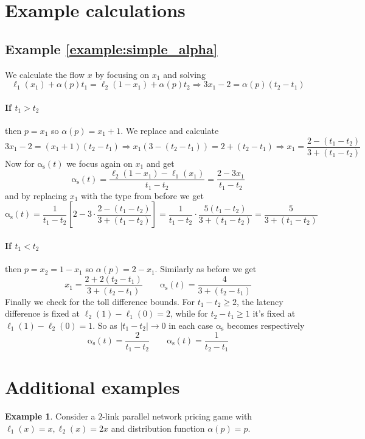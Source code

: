 \documentclass[10pt,a4paper]{book}
\newcommand{\as}{\mathrm{\alpha_s}}
\theoremstyle{definition}
\theoremstyle{comment}
\newtheorem{example}[definition]{Example}
\begin{document}
\section*{Example calculations}

\subsection*{Example \ref{example:simple_alpha}}

We calculate the flow $x$ by focusing on $x_1$ and solving
\[
	\ell_1(x_1) + \alpha(p)t_1 = \ell_2(1 - x_1) + \alpha(p) t_2 \Rightarrow 3 x_1 - 2 = \alpha(p) (t_2 - t_1)
\]

\paragraph{If $t_1 > t_2$} then $p = x_1$ so $\alpha(p) = x_1 + 1$.
We replace and calculate
\[
	3 x_1 - 2 = (x_1 + 1) (t_2 - t_1) \Rightarrow x_1 (3 - (t_2 - t_1)) = 2 + (t_2 - t_1) \Rightarrow x_1 = \frac{2 - (t_1 - t_2)}{3 + (t_1 - t_2)}
\]
Now for $\as(t)$ we focus again on $x_1$ and get
\[
	\as(t) = \frac{\ell_2(1 - x_1) - \ell_1(x_1)}{t_1 - t_2} = \frac{2 - 3 x_1}{t_1 - t_2}
\]
and by replacing $x_1$ with the type from before we get
\[
	\as(t) = \frac{1}{t_1 - t_2} \left[2 - 3 \cdot \frac{2 - (t_1 - t_2)}{3 + (t_1 - t_2)}\right] = \frac{1}{t_1 - t_2} \cdot \frac{5(t_1 - t_2)}{3 + (t_1 - t_2)} = \frac{5}{3 + (t_1 - t_2)}
\]

\paragraph{If $t_1 < t_2$} then $p = x_2 = 1 - x_1$ so $\alpha(p) = 2 - x_1$.
Similarly as before we get
\[
	x_1 = \frac{2 + 2(t_2 - t_1)}{3 + (t_2 - t_1)} \qquad \as(t) = \frac{4}{3 + (t_2 - t_1)}
\]
Finally we check for the toll difference bounds.
For $t_1 - t_2 \ge 2$, the latency difference is fixed at $\ell_2(1) - \ell_1(0) = 2$, while for $t_2 - t_1 \ge 1$ it's fixed at $\ell_1(1) - \ell_2(0) = 1$.
So as $|t_1 - t_2| \rightarrow 0$ in each case $\as$ becomes respectively
\[
	\as(t) = \frac{2}{t_1 - t_2} \qquad \as(t) = \frac{1}{t_2 - t_1}
\]


\section*{Additional examples}

\begin{example}
	\label{example:ap_p}
	Consider a $2$-link parallel network pricing game with $\ell_1(x) = x, \ell_2(x) = 2x$ and distribution function $\alpha(p) = p$.
\end{example}
\end{document}
